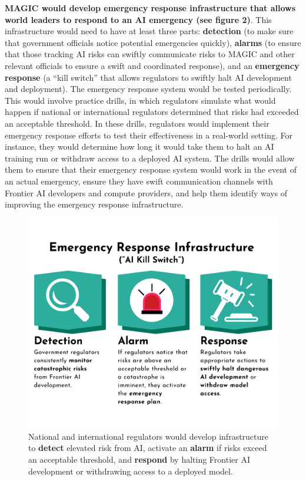 \documentclass[12pt,a4paper]{article}
\begin{document}
\textbf{MAGIC would develop emergency response infrastructure that allows world leaders to respond to an AI emergency (see figure 2)}. This infrastructure would need to have at least three parts: \textbf{detection} (to make sure that government officials notice potential emergencies quickly), \textbf{alarms} (to ensure that those tracking AI risks can swiftly communicate risks to MAGIC and other relevant officials to ensure a swift and coordinated response), and an \textbf{emergency response} (a “kill switch” that allows regulators to swiftly halt AI development and deployment). 
The emergency response system would be tested periodically. This would involve practice drills, in which regulators simulate what would happen if national or international regulators determined that risks had exceeded an acceptable threshold. In these drills, regulators would implement their emergency response efforts to test their effectiveness in a real-world setting. For instance, they would determine how long it would take them to halt an AI training run or withdraw access to a deployed AI system. The drills would allow them to ensure that their emergency response system would work in the event of an actual emergency, ensure they have swift communication channels with Frontier AI developers and compute providers, and help them identify ways of improving the emergency response infrastructure. 

\begin{figure}[h]
    \centering
    \includegraphics[width=0.8\linewidth]{figure2.png}
    \caption{National and international regulators would develop infrastructure to \textbf{detect} elevated risk from AI, activate an \textbf{alarm} if risks exceed an acceptable threshold, and \textbf{respond} by halting Frontier AI development or withdrawing access to a deployed model.}
    \label{fig:enter-label}
\end{figure}
\end{document}
